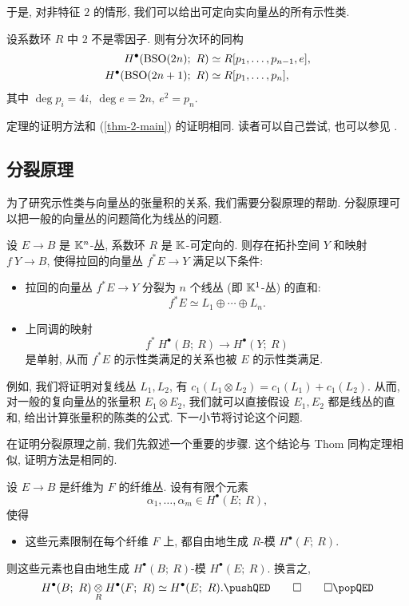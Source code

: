 于是, 对非特征 $2$ 的情形,
我们可以给出可定向实向量丛的所有示性类.

\begin{theorem} \label{thm-3-pon-class}
    设系数环 $R$ 中 $2$ 不是零因子. 则有分次环的同构
    \[ \begin{aligned}
        H^\bullet (\mathrm{B} \mathrm{SO} (2n);\ R) & \simeq R[p_1, \dotsc, p_{n-1}, e], \\
        H^\bullet (\mathrm{B} \mathrm{SO} (2n + 1);\ R) & \simeq R[p_1, \dotsc, p_n],
    \end{aligned} \]
    其中 $\deg p_i = 4i,\ \deg e = 2n,\ e^2 = p_n$.
\end{theorem}

定理的证明方法和 (\ref{thm-2-main}) 的证明相同.
读者可以自己尝试, 也可以参见 \cite[\S3.5.3]{cohen}.

\subsection{分裂原理}

为了研究示性类与向量丛的张量积的关系,
我们需要分裂原理的帮助.
分裂原理可以把一般的向量丛的问题简化为线丛的问题.

\begin{theorem}[分裂原理] \label{thm-3-splitting}
    设 $E \to B$ 是 $\mathbb{K}^n$-丛, 系数环 $R$ 是 $\mathbb{K}$-可定向的.
    则存在拓扑空间 $Y$ 和映射 $f \: Y \to B$,
    使得拉回的向量丛 $f^* E \to Y$ 满足以下条件:
    \begin{itemize}
        \item
            拉回的向量丛 $f^* E \to Y$
            分裂为 $n$ 个线丛 (即 $\mathbb{K}^1$-丛) 的直和:
            \[ f^* E \simeq L_1 \oplus \cdots \oplus L_n. \]
        \item
            上同调的映射 
            \[ f^* \: H^\bullet (B;\ R) \to H^\bullet (Y;\ R) \]
            是单射, 从而 $f^* E$ 的示性类满足的关系也被 $E$ 的示性类满足.
    \end{itemize}
\end{theorem}

例如, 我们将证明对复线丛 $L_1, L_2$,
有 $c_1 (L_1 \otimes L_2) = c_1 (L_1) + c_1 (L_2)$.
从而, 对一般的复向量丛的张量积 $E_1 \otimes E_2$, 
我们就可以直接假设 $E_1, E_2$ 都是线丛的直和, 给出计算张量积的陈类的公式.
下一小节将讨论这个问题.

在证明分裂原理之前, 我们先叙述一个重要的步骤.
这个结论与 Thom 同构定理相似, 证明方法是相同的.

\begin{theorem} \label{thm-3-leray-hirsch}
    设 $E \to B$ 是纤维为 $F$ 的纤维丛. 
    设有有限个元素
    \[ \alpha_1, \dotsc, \alpha_m \in H^\bullet (E;\ R), \]
    使得
    \begin{itemize}
        \item
            这些元素限制在每个纤维 $F$ 上,
            都自由地生成 $R$-模 $H^\bullet (F;\ R)$.
    \end{itemize}
    则这些元素也自由地生成 $H^\bullet (B;\ R)$-模 $H^\bullet (E;\ R)$.
    换言之,
    \[ H^\bullet (B;\ R) \underset{R}{\otimes} H^\bullet (F;\ R)
        \simeq H^\bullet (E;\ R). \thmqedhere \]
\end{theorem}

